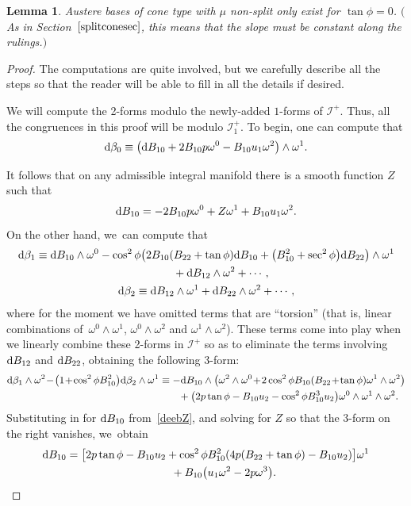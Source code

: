 \documentclass[pdftex]{sigma}
\def\calI{\mathcal{I}}
\def\w{\omega}
\newtheorem{Lemma}[Theorem]{Lemma}
\numberwithin{equation}{section}
\begin{document}
\begin{Lemma} \label{coneconstant}
Austere bases of cone type with $\mu$ non-split only exist for $\tan\phi = 0$. $($As in Section~$\ref{splitconesec}$, this means that the slope must be constant along the rulings.$)$
\end{Lemma}
\begin{proof}
The computations are quite involved, but we carefully describe all the steps so that the reader will be able to fill in all the details if desired.

We will compute the 2-forms modulo the newly-added $1$-forms of $\calI^+$. Thus, all the congruences in this proof will be modulo $\calI^+_1$. To begin, one can compute that
\begin{gather*}
{\rm d}\beta_0 \equiv \big({\rm d}B_{10} +2B_{10} p \w^0 -B_{10} u_1 \w^2 \big) \wedge \w^1.
\end{gather*}

It follows that on any admissible integral manifold there is a smooth function $Z$ such that
\begin{gather} \label{deebZ}
{\rm d}B_{10} = -2B_{10} p \w^0+Z \w^1 +B_{10} u_1 \w^2.
\end{gather}
On the other hand, we~can compute that
\begin{gather*}
{\rm d}\beta_1 \equiv {\rm d}B_{10} \wedge \w^0 -\cos^2\phi \big( 2B_{10} (B_{22}+\tan\phi) {\rm d}B_{10} + \big(B_{10}^2 + \sec^2\phi\big) {\rm d}B_{22}\big) \wedge \w^1
\\ \hphantom{{\rm d}\beta_1 \equiv}
{} + {\rm d}B_{12}\wedge \w^2 + \cdots,
 \\
{\rm d}\beta_2 \equiv {\rm d}B_{12} \wedge \w^1 + {\rm d}B_{22}\wedge \w^2 + \cdots,
\end{gather*}
where for the moment we have omitted terms that are ``torsion'' (that is, linear combinations of~$\w^0 \wedge \w^1$, $\w^0 \wedge \w^2$ and $\w^1 \wedge \w^2$). These terms come into play when we linearly combine these 2-forms in $\calI^+$ so as to eliminate the terms involving ${\rm d}B_{12}$ and ${\rm d}B_{22}$, obtaining the following 3-form:
\begin{gather*}
{\rm d}\beta_1 \wedge \w^2 \!-\!\big(1\!+\!\cos^2\phi B_{10}^2\big) {\rm d}\beta_2 \wedge \w^1
\equiv -{\rm d}B_{10} \wedge \big( \w^2 \wedge \w^0\! +\! 2\cos^2\phi B_{10}(B_{22}\!+\!\tan\phi) \w^1 \wedge \w^2\big)
\\ \hphantom{{\rm d}\beta_1 \wedge \w^2 \!-\!\big(1\!+\!\cos^2\phi B_{10}^2\big) {\rm d}\beta_2 \wedge \w^1
\equiv\,}
{} + \big( 2p\tan\phi -B_{10} u_2 -\cos^2\phi B_{10}^3 u_2\big) \w^0 \wedge \w^1 \wedge \w^2.
\end{gather*}
Substituting in for ${\rm d}B_{10}$ from~\eqref{deebZ}, and solving for $Z$ so that the 3-form on the right vanishes, we~obtain
\begin{gather}
{\rm d}B_{10} = \big[ 2p\tan\phi - B_{10} u_2 + \cos^2\phi B_{10}^2 (4p(B_{22} + \tan\phi) - B_{10} u_2)\big] \w^1 \nonumber\\
\hphantom{{\rm d}B_{10} =}{} + B_{10} \big(u_1 \w^2 - 2 p \w^3\big). \label{deeb}
\end{gather}


\end{proof}
\end{document}
